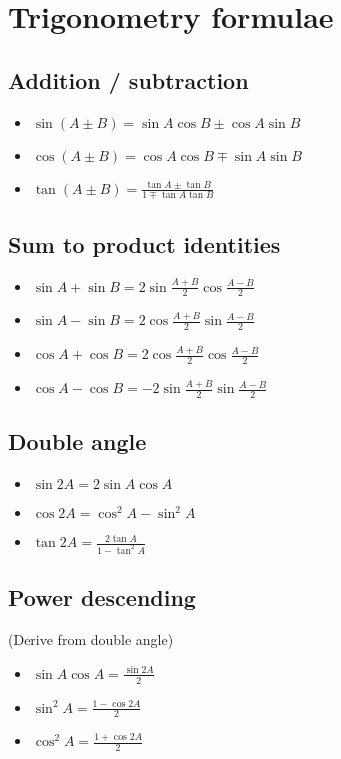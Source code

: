 \section{Trigonometry formulae}
\subsection{Addition / subtraction}
\begin{itemize}
    \item $\sin (A \pm B) = \sin A \cos B \pm \cos A \sin B$
    \item $\cos (A \pm B) = \cos A \cos B \mp \sin A \sin B$
    \item $\tan (A \pm B) = \frac{\tan A \pm \tan B}{1 \mp \tan A \tan B}$
\end{itemize}
\subsection{Sum to product identities}
\begin{itemize}
    \item $\sin A + \sin B = 2\sin \frac{A+B}{2} \cos\frac{A-B}{2}$
    \item $\sin A - \sin B = 2\cos \frac{A+B}{2} \sin\frac{A-B}{2}$
    \item $\cos A + \cos B = 2\cos \frac{A+B}{2} \cos\frac{A-B}{2}$
    \item $\cos A - \cos B = -2\sin \frac{A+B}{2} \sin\frac{A-B}{2}$
\end{itemize}
\subsection{Double angle}
\begin{itemize}
    \item $\sin 2A = 2\sin A \cos A$
    \item $\cos 2A = \cos^2 A - \sin^2 A$
    \item $\tan 2A = \frac{2\tan A}{1-\tan^2 A}$
\end{itemize}
\subsection{Power descending}
(Derive from double angle)
\begin{itemize}
    \item $\sin A \cos A = \frac{\sin2A}{2}$
    \item $\sin^2 A = \frac{1-\cos2A}{2}$
    \item $\cos^2 A = \frac{1+\cos2A}{2}$
\end{itemize}
